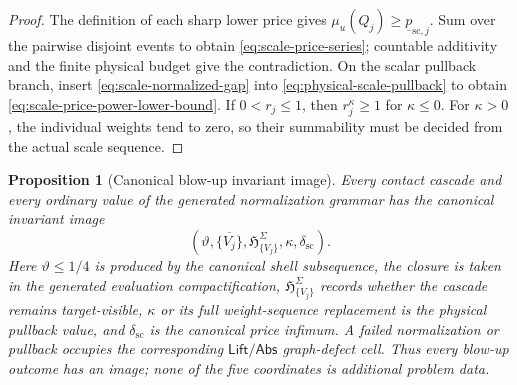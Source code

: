 \documentclass[11pt]{article}
\numberwithin{section}{part}
\theoremstyle{plain}
\newtheorem{proposition}[proposition]{Proposition}
\theoremstyle{definition}
\theoremstyle{remark}
\newcommand{\Abs}{\mathsf{Abs}}
\newcommand{\Lift}{\mathsf{Lift}}
\begin{document}
\begin{proof}
The definition of each sharp lower price gives
\(\mu_u(Q_j)\ge\underline p_{\mathrm{sc},j}\).  Sum over the pairwise
disjoint events to obtain \eqref{eq:scale-price-series}; countable additivity
and the finite physical budget give the contradiction.  On the scalar
pullback branch, insert \eqref{eq:scale-normalized-gap} into
\eqref{eq:physical-scale-pullback} to obtain
\eqref{eq:scale-price-power-lower-bound}.  If \(0<r_j\le1\), then
\(r_j^\kappa\ge1\) for \(\kappa\le0\).  For \(\kappa>0\), the individual
weights tend to zero, so their summability must be decided from the actual
scale sequence.
\end{proof}

\begin{proposition}[Canonical blow-up invariant image]
\label{prop:blowup-structural-data}
Every contact cascade and every ordinary value of the generated normalization
grammar has the canonical invariant image
\begin{equation}
 \label{eq:blowup-invariant-tuple}
 \left(
  \vartheta,
  \overline{\{V_j\}},
  \mathfrak H_{\{V_j\}}^\Sigma,
  \kappa,
  \delta_{\mathrm{sc}}
 \right).
\end{equation}
Here \(\vartheta\le1/4\) is produced by the canonical shell subsequence, the
closure is taken in the generated evaluation compactification,
\(\mathfrak H_{\{V_j\}}^\Sigma\) records whether the cascade remains
target-visible, \(\kappa\) or its full weight-sequence replacement is the
physical pullback value, and \(\delta_{\mathrm{sc}}\) is the canonical price
infimum.  A failed normalization or pullback occupies the corresponding
\(\Lift/\Abs\) graph-defect cell.  Thus every blow-up outcome has an image;
none of the five coordinates is additional problem data.
\end{proposition}
\end{document}
